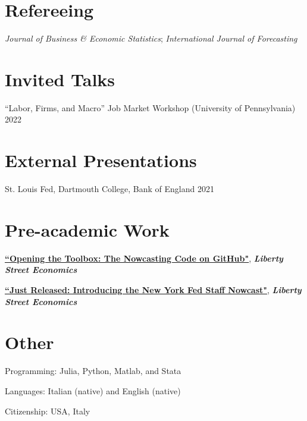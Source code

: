 \documentclass[margin,line]{res}                          %
\newenvironment{list1}{
	\begin{list}{\ding{113}}{%
			\setlength{\itemsep}{0in}
			\setlength{\parsep}{0in} \setlength{\parskip}{0in}
			\setlength{\topsep}{0in} \setlength{\partopsep}{0in}
			\setlength{\leftmargin}{0.17in}}}{\end{list}}
\begin{document}
\begin{resume}
	\section{\sc Refereeing}
	\begin{list1}
		\item[] \emph{Journal of Business \& Economic Statistics}; \emph{International Journal of Forecasting} \smallskip
	\end{list1}
	
	\section{\sc Invited Talks}
	\begin{list1}
		\item[] ``Labor, Firms, and Macro'' Job Market Workshop (University of Pennsylvania)  \hfill 2022 \smallskip
	\end{list1}
	
	\section{\sc External Presentations}
	\begin{list1}
		\item[] St. Louis Fed, Dartmouth College, Bank of England  \hfill 2021 \smallskip
	\end{list1}
	
	\section{\sc Pre-academic Work} 
	\begin{list1}
		\item[] \href{https://libertystreeteconomics.newyorkfed.org/2018/08/opening-the-toolbox-the-nowcasting-code-on-github/}{\textbf{``Opening the Toolbox: The Nowcasting Code on GitHub"}}, \textit{\textbf{Liberty Street Economics}}  \smallskip
		\item[] \href{https://libertystreeteconomics.newyorkfed.org/2016/04/just-released-introducing-the-frbny-nowcast/}{\textbf{``Just Released: Introducing the New York Fed Staff Nowcast"}}, \textit{\textbf{Liberty Street Economics}} \smallskip            
	\end{list1}
	
	\section{\sc Other}
	\begin{list1}
		\item[] Programming: Julia, Python, Matlab, and Stata \smallskip
		\item[] Languages: Italian (native) and English (native) \smallskip
		\item[] Citizenship: USA, Italy \smallskip
	\end{list1}
	
	
	
	
\end{resume}
\end{document}
